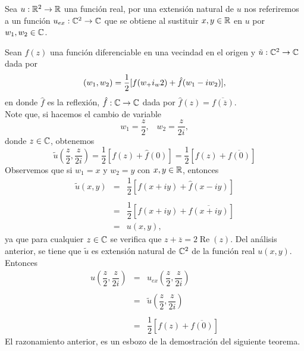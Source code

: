 \begin{defi}
	Sea $u:\mathbb{R}^2\rightarrow\mathbb{R}$ una función real, por una extensión natural de $u$ nos referiremos a un función $u_{ex}:\mathbb{C}^2\rightarrow\mathbb{C}$ que se obtiene al sustituir $x,y\in\mathbb{R}$ en $u$ por $w_1,w_2\in\mathbb{C}$.
\end{defi}
\noindent Sean $f(z)$ una función diferenciable en una vecindad en el origen y $\tilde{u}:\mathbb{C}^2\rightarrow\mathbb{C}$ dada por
\begin{equation}\label{AS1}
	\title{u}(w_1,w_2)=\dfrac{1}{2}[f(w_+i_w2)+\hat{f}(w_1-iw_2)],
\end{equation}
en donde  $\hat{f}$ es la reflexión, $\hat{f}:\mathbb{C}\rightarrow\mathbb{C}$ dada por $\hat{f}(z)=\overline{f(\overline{z})}$.\\
\noindent Note que, si  hacemos el cambio de variable 
\begin{equation}\label{AS2}
	w_1=\dfrac{z}{2},\;\;\;w_2=\dfrac{z}{2i},
\end{equation}
donde $z\in\mathbb{C}$, obtenemos 
\begin{equation}\label{AS3}
	\tilde{u}\left(\dfrac{z}{2},\dfrac{z}{2i}\right)=\dfrac{1}{2}[f(z)+\hat{f}(0)]=\dfrac{1}{2}[f(z)+\overline{f(0)}]
\end{equation}
Observemos que si $w_1=x$ y $w_2=y$ con $x,y\in\mathbb{R}$, entonces 
\[
	\begin{array}{ccl}
		\tilde{u}(x,y)&=&\dfrac{1}{2}[f(x+iy)+\hat{f}(x-iy)]\\\\
		&=&\dfrac{1}{2}[f(x+iy)+\overline{f(x+iy)}]\\
		&=&u(x,y),
	\end{array}
\]
ya que para cualquier $z\in\mathbb{C}$ se verifica que $z+\overline{z}=2\operatorname{Re}(z)$. Del análisis anterior, se tiene que $\tilde{u}$ es extensión natural de $\mathbb{C}^2$ de la función real $u(x,y)$. Entonces
\[
	\begin{array}{ccl}
		u\left(\dfrac{z}{2},\dfrac{z}{2i}\right)&=&u_{ex}\left(\dfrac{z}{2},\dfrac{z}{2i}\right)\\\\
		&=&\tilde{u}\left(\dfrac{z}{2},\dfrac{z}{2i}\right)\\\\
		&=&\dfrac{1}{2}[f(z)+\overline{f(0)}]
	\end{array}
\]
El razonamiento anterior, es un esbozo de la demostración del siguiente teorema.

